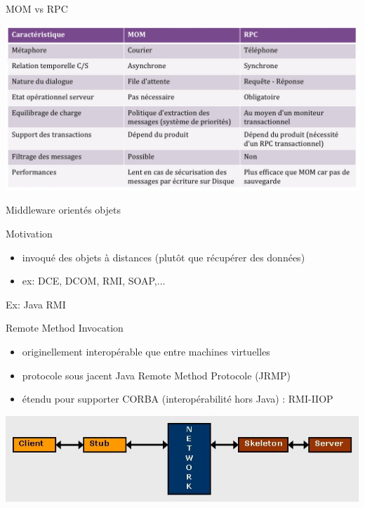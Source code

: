 {  \begin{frame}{MOM vs RPC}
    \begin{center}
      \includegraphics[scale=0.22]{img/mom-rpc.png}
    \end{center}
  \end{frame}

  \begin{frame}{Middleware orientés objets}
   \begin{block}{Motivation}
     \begin{itemize}
       \item invoqué des objets à distances (plutôt que récupérer des données)
       \item ex: DCE, DCOM, RMI, SOAP,...
     \end{itemize}
    \end{block}
  \end{frame}

  \begin{frame}{Ex: Java RMI}
    \begin{block}{Remote Method Invocation}
     \begin{itemize}
       \item originellement interopérable que entre machines virtuelles
       \item protocole sous jacent Java Remote Method Protocole (JRMP)
       \item étendu pour supporter CORBA (interopérabilité hors Java) : RMI-IIOP
     \end{itemize}
    \end{block}

    \begin{center}
      \includegraphics[scale=0.6]{img/rmi-stubs-skeletons.jpg}
    \end{center}
  \end{frame}

}

